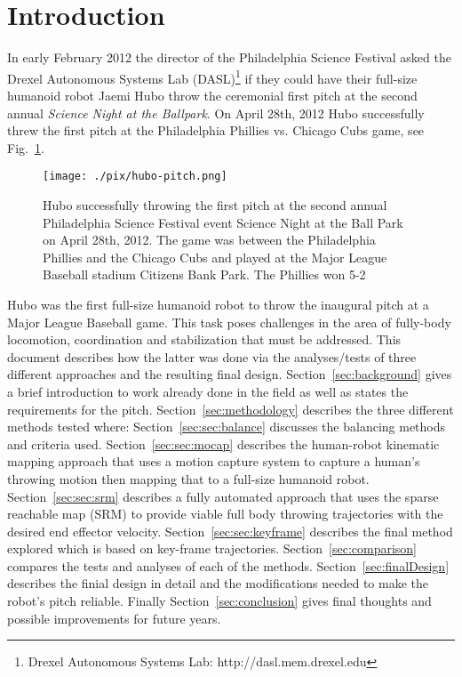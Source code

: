 \section{Introduction}
In early February 2012 the director of the Philadelphia Science Festival asked the Drexel Autonomous Systems Lab (DASL)\footnote{Drexel Autonomous Systems Lab: http://dasl.mem.drexel.edu}\label{foot:dasl} if they could have their full-size humanoid robot Jaemi Hubo throw the ceremonial first pitch at the second annual \textit{Science Night at the Ballpark}.  
On April 28th, 2012 Hubo successfully threw the first pitch at the Philadelphia Phillies vs. Chicago Cubs game, see Fig.~\ref{fig:hubo-throw}.  

\begin{figure}[t]
  \centering
\texttt{[image: ./pix/hubo-pitch.png]}
  \caption{Hubo successfully throwing the first pitch at the second annual Philadelphia Science Festival event Science Night at the Ball Park on April 28th, 2012.  The game was between the Philadelphia Phillies and the Chicago Cubs and played at the Major League Baseball stadium Citizens Bank Park.  The Phillies won 5-2}
  \label{fig:hubo-throw}
\end{figure}



Hubo was the first full-size humanoid robot to throw the inaugural pitch at a Major League Baseball game.  
This task poses challenges in the area of fully-body locomotion, coordination and stabilization that must be addressed.
This document describes how the latter was done via the analyses/tests of three different approaches and the resulting final design.
Section~\ref{sec:background} gives a brief introduction to work already done in the field as well as states the requirements for the pitch.
Section~\ref{sec:methodology} describes the three different methods tested where:
Section~\ref{sec:sec:balance} discusses the balancing methods and criteria used.
Section~\ref{sec:sec:mocap} describes the human-robot kinematic mapping approach that uses a motion capture system to capture a human's throwing motion then mapping that to a full-size humanoid robot.  
Section~\ref{sec:sec:srm} describes a fully automated approach that uses the sparse reachable map (SRM) to provide viable full body throwing trajectories with the desired end effector velocity\cite{dlofaro-srm}.
Section~\ref{sec:sec:keyframe} describes the final method explored which is based on key-frame trajectories.
Section~\ref{sec:comparison} compares the tests and analyses of each of the methods.
Section~\ref{sec:finalDesign} describes the finial design in detail and the modifications needed to make the robot's pitch reliable.
Finally Section~\ref{sec:conclusion} gives final thoughts and possible improvements for future years.


